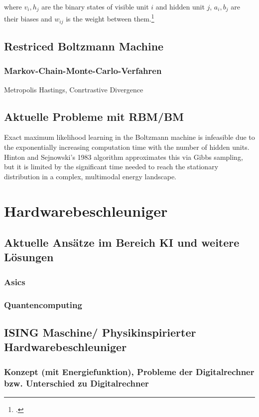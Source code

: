 where \( v_i, h_j \) are the binary states of visible unit \( i \) and hidden unit \( j \), \( a_i, b_j \) are their biases and \( w_{ij} \) is the weight between them.\footcite[Vgl.][3-4]{hintonPracticalGuideTraining2012a}

\subsection{Restriced Boltzmann Machine}


\subsubsection{Markov-Chain-Monte-Carlo-Verfahren}
Metropolis Hastings,
Conrtrastive Divergence

\subsection{Aktuelle Probleme mit RBM/BM}


Exact maximum likelihood learning in the Boltzmann machine is infeasible due to the exponentially increasing computation time with the number of hidden units.
Hinton and Sejnowski's 1983 algorithm approximates this via Gibbs sampling, but it is limited by the significant time needed to reach the stationary distribution in a complex, multimodal energy landscape.

\section{Hardwarebeschleuniger}
\subsection{Aktuelle Ansätze im Bereich KI und weitere Lösungen}
\subsubsection{Asics}
\subsubsection{Quantencomputing}
\subsection{ISING Maschine/ Physikinspirierter Hardwarebeschleuniger}
\subsubsection{Konzept (mit Energiefunktion), Probleme der Digitalrechner bzw. Unterschied zu Digitalrechner}
